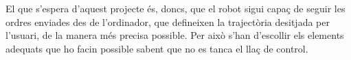 El que s'espera d'aquest projecte és, doncs, que el robot sigui capaç de seguir les ordres enviades des de l'ordinador, que defineixen la trajectòria desitjada per l'usuari, de la manera més precisa possible. Per això s'han d'escollir els elements adequats que ho facin possible sabent que no es tanca el llaç de control.  









